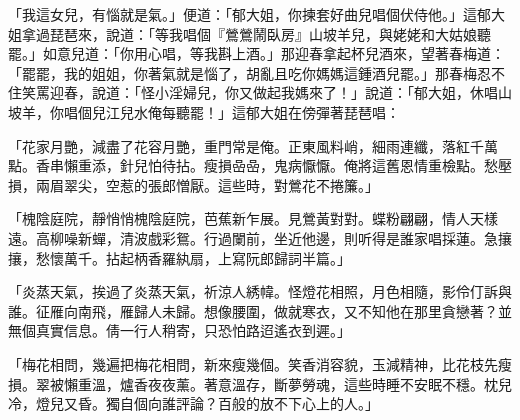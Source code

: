 \begin{showcontents}{}
「我這女兒，有惱就是氣。」便道：「郁大姐，你揀套好曲兒唱個伏侍他。」這郁大姐拿過琵琶來，說道：「等我唱個『鶯鶯鬧臥房』山坡羊兒，與姥姥和大姑娘聽罷。」如意兒道：「你用心唱，等我斟上酒。」那迎春拿起杯兒酒來，望著春梅道：「罷罷，我的姐姐，你著氣就是惱了，胡亂且吃你媽媽這鍾酒兒罷。」那春梅忍不住笑罵迎春，說道：「怪小淫婦兒，你又做起我媽來了！」說道：「郁大姐，休唱山坡羊，你唱個兒江兒水俺每聽罷！」這郁大姐在傍彈著琵琶唱：

「花家月艷，減盡了花容月艷，重門常是俺。正東風料峭，細雨連纖，落紅千萬點。香串懶重添，針兒怕待拈。瘦損喦喦，鬼病懨懨。俺將這舊恩情重檢點。愁壓損，兩眉翠尖，空惹的張郎憎厭。這些時，對鶯花不捲簾。」

「槐陰庭院，靜悄悄槐陰庭院，芭蕉新乍展。見鶯黃對對。蝶粉翩翩，情人天樣遠。高柳噪新蟬，清波戲彩鴛。行過闌前，坐近他邊，則听得是誰家唱採蓮。急攘攘，愁懷萬千。拈起柄香羅紈扇，上寫阮郎歸詞半篇。」

「炎蒸天氣，挨過了炎蒸天氣，祈涼人綉幃。怪燈花相照，月色相隨，影伶仃訴與誰。征雁向南飛，雁歸人未歸。想像腰圍，做就寒衣，又不知他在那里貪戀著？並無個真實信息。倩一行人稍寄，只恐怕路迢遙衣到遲。」

「梅花相問，幾遍把梅花相問，新來瘦幾個。笑香消容貌，玉減精神，比花枝先瘦損。翠被懶重溫，爐香夜夜薰。著意溫存，斷夢勞魂，這些時睡不安眠不穩。枕兒冷，燈兒又昏。獨自個向誰評論？百般的放不下心上的人。」


\end{showcontents}
